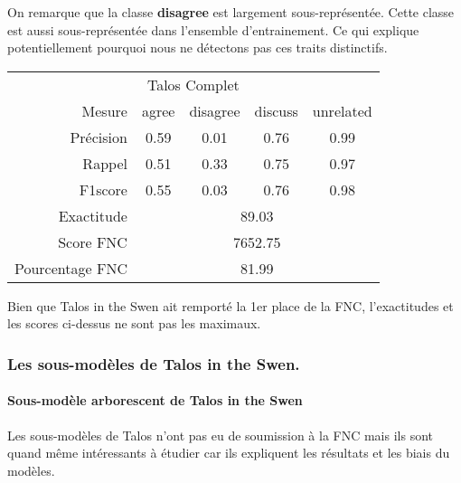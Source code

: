 \documentclass[onecolumn, 12pt]{article}
\begin{document}
On remarque que la classe \textbf{disagree} est largement sous-représentée. Cette classe est aussi sous-représentée dans l'ensemble d'entrainement. Ce qui explique potentiellement pourquoi nous ne détectons pas ces traits distinctifs.
\begin{center}
 \begin{tabular}{ r | c c c c }
  \multicolumn{5}{c}{Talos Complet}                                              \\
  Mesure          & agree                       & disagree & discuss & unrelated \\
  \hline
  Précision       & 0.59                        & 0.01     & 0.76    & 0.99      \\
  Rappel          & 0.51                        & 0.33     & 0.75    & 0.97      \\
  F1score         & 0.55                        & 0.03     & 0.76    & 0.98      \\
  \hline
  \hline
  Exactitude      & \multicolumn{4}{c}{89.03}                                    \\
  Score FNC       & \multicolumn{4}{c}{7652.75}                                  \\
  Pourcentage FNC & \multicolumn{4}{c}{81.99}                                    \\
 \end{tabular}
\end{center}

Bien que Talos in the Swen ait remporté la 1er place de la FNC, l'exactitudes et les scores ci-dessus ne sont pas les maximaux.



\subsubsection{Les sous-modèles de Talos in the Swen.}
\paragraph{Sous-modèle arborescent de Talos in the Swen}
Les sous-modèles de Talos n'ont pas eu de soumission à la FNC mais ils sont quand même intéressants à étudier car ils expliquent les résultats et les biais du modèles.
\end{document}
